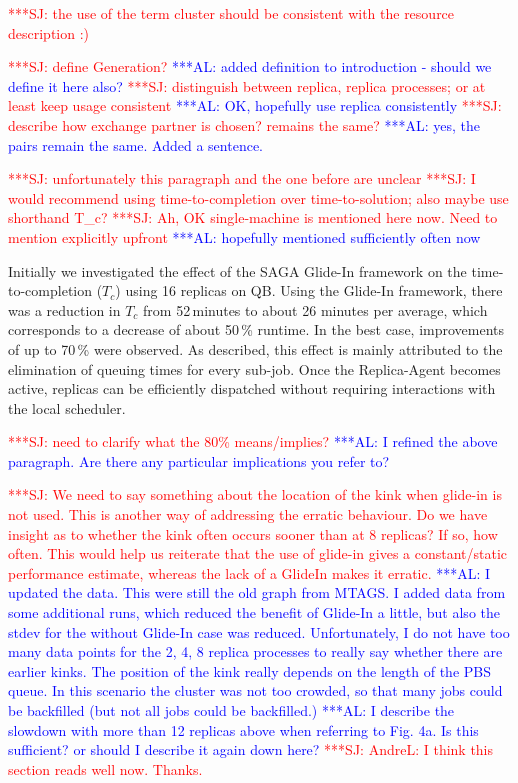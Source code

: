 \documentclass{rspublic}
\newcommand{\alnote}[1]{ {\textcolor{blue} { ***AL: #1 }}}
\newcommand{\jhanote}[1]{ {\textcolor{red} { ***SJ: #1 }}}
\newcommand{\alnote}[1]{}
\newcommand{\jhanote}[1]{}
\begin{document}
\jhanote{the use of the term cluster should be consistent with the
  resource description :)}

\jhanote{define Generation?}  \alnote{added definition to introduction
  - should we define it here also?}  \jhanote{distinguish between
  replica, replica processes; or at least keep usage consistent}
\alnote{OK, hopefully use replica consistently} \jhanote{describe how
  exchange partner is chosen? remains the same?}\alnote{yes, the pairs
  remain the same. Added a sentence.}


\jhanote{unfortunately this paragraph and the one before are unclear}
\jhanote{I would recommend using time-to-completion over
  time-to-solution; also maybe use shorthand T\_c?}  \jhanote{Ah, OK
  single-machine is mentioned here now. Need to mention explicitly
  upfront} \alnote{hopefully mentioned sufficiently often now}

Initially we investigated the effect of the SAGA
Glide-In framework on the time-to-completion ($T_{c}$) using 16
replicas on QB.  Using the Glide-In framework, there was a reduction
in $T_{c}$ from 52\,minutes to about 26 minutes per average, which
corresponds to a decrease of about 50\,\% runtime.  In the best case,
improvements of up to 70\,\% were observed. As described, this effect
is mainly attributed to the elimination of queuing times for every
sub-job. Once the Replica-Agent becomes active, replicas can be
efficiently dispatched without requiring interactions with the local
scheduler.

\jhanote{need to clarify what the 80\% means/implies?} \alnote{I
  refined the above paragraph. Are there any particular implications
  you refer to?}

\jhanote{We need to say something about the location of the kink when
  glide-in is not used. This is another way of addressing the erratic
  behaviour. Do we have insight as to whether the kink often occurs
  sooner than at 8 replicas? If so, how often.  This would help us
  reiterate that the use of glide-in gives a constant/static
  performance estimate, whereas the lack of a GlideIn makes it
  erratic.}  \alnote{I updated the data. This were still the old graph
  from MTAGS. I added data from some additional runs, which reduced
  the benefit of Glide-In a little, but also the stdev for the without
  Glide-In case was reduced. Unfortunately, I do not have too many
  data points for the 2, 4, 8 replica processes to really say whether
  there are earlier kinks.  The position of the kink really depends on
  the length of the PBS queue. In this scenario the cluster was not
  too crowded, so that many jobs could be backfilled (but not all jobs
  could be backfilled.)}  \alnote{I describe the slowdown with more
  than 12 replicas above when referring to Fig. 4a. Is this
  sufficient? or should I describe it again down here?}
\jhanote{AndreL: I think this section reads well now. Thanks.}
\end{document}
